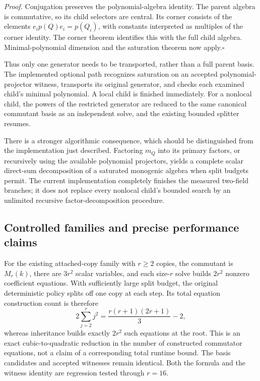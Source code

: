 \emph{Proof.}
Conjugation preserves the polynomial-algebra identity. The parent algebra
is commutative, so its child selectors are central. Its corner consists of
the elements $e_ip(Q)e_i=p(Q_i)$, with constants interpreted as multiples
of the corner identity. The corner theorem identifies this with the full
child algebra. Minimal-polynomial dimension and the saturation theorem
now apply.\hfill$\square$

Thus only one generator needs to be transported, rather than a full parent
basis. The implemented optional path recognizes saturation on an accepted
polynomial-projector witness, transports its original generator, and checks
each examined child's minimal polynomial. A local child is finished
immediately. For a nonlocal child, the powers of the restricted generator
are reduced to the same canonical commutant basis as an independent solve,
and the existing bounded splitter resumes.

There is a stronger algorithmic consequence, which should be distinguished
from the implementation just described. Factoring $m_Q$ into its primary
factors, or recursively using the available polynomial projectors, yields a
complete scalar direct-sum decomposition of a saturated monogenic algebra
when split budgets permit. The current implementation completely finishes
the measured two-field branches; it does not replace every nonlocal child's
bounded search by an unlimited recursive factor-decomposition procedure.

\subsection{Controlled families and precise performance claims}

For the existing attached-copy family with $r\geq2$ copies, the commutant is
$M_r(k)$, there are $3r^2$ scalar variables, and each size-$r$ solve builds
$2r^2$ nonzero coefficient equations. With sufficiently large split budget,
the original deterministic policy splits off one copy at each step. Its
total equation construction count is therefore
\[
 2\sum_{j=2}^r j^2
   =\frac{r(r+1)(2r+1)}3-2,
\]
whereas inheritance builds exactly $2r^2$ such equations at the root. This
is an exact cubic-to-quadratic reduction in the number of constructed
commutator equations, not a claim of a corresponding total runtime bound.
The basis candidates and accepted witnesses remain identical. Both the
formula and the witness identity are regression tested through $r=16$.

